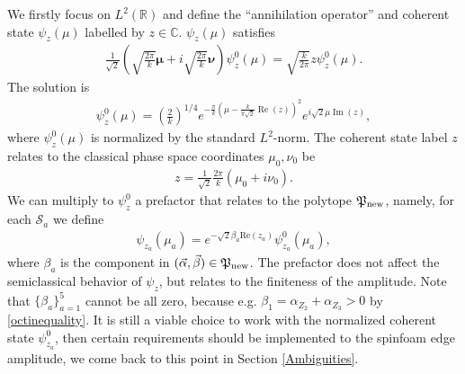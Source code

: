 \documentclass[aps,prd,notitlepage,nofootinbib,superscriptaddress,groupedaddress,twocolumn]{revtex4-1}
\def\C{\mathbb{C}}
\def\R{\mathbb{R}}
\def\be{\begin{eqnarray}}
\def\ee{\end{eqnarray}}
\newcommand{\cs}{\mathcal S}
\renewcommand{\a}{\alpha}
\renewcommand{\b}{\beta}
\newcommand{\rmd}{\mathrm d}
\newcommand{\lt}{\left}
\newcommand{\rt}{\right}
\begin{document}
We firstly focus on $L^2(\R)$ and define the ``annihilation operator'' and coherent state $\psi_z(\mu)$ labelled by $z\in\C$. $\psi_z(\mu)$ satisfies
\be
\frac{1}{\sqrt{2}}\lt(\sqrt{\frac{2\pi}{k}}\bm{\mu}+i\sqrt{\frac{2\pi}{k}}\bm{\nu}\rt)\psi^0_z(\mu)%
=\sqrt{\frac{k}{2\pi}}z\psi^0_z(\mu).\nonumber
\ee
The solution is
\be
\psi^0_z(\mu)%
=\lt(\frac{2}{k}\rt)^{1/4}e^{-\frac{\pi}{k}\left(\mu-\frac{k}{\pi \sqrt{2}} \operatorname{Re}\left(z\right)\right)^{2}} e^{i \sqrt{2}  \mu \operatorname{Im}\left(z\right)},\label{coheretntpsiz0}
\ee
where $\psi^0_z(\mu)$ is normalized by the standard $L^2$-norm. %
The coherent state label $z$ relates to the classical phase space coordinates $\mu_0,\nu_0$ be
\be
z=\frac{1}{\sqrt{2}}\frac{2\pi}{k}(\mu_0 +i\nu_0).\label{zmunu}
\ee
We can multiply to $\psi^0_z$ a prefactor that relates to the polytope $\mathfrak{P}_{\rm new}$, namely, for each $\cs_a$ we define
\be
\psi_{z_a}(\mu_a)=e^{-\sqrt{2}\b_a\mathrm{Re}(z_a)}\psi^0_{z_a}(\mu_a),\label{coheretntpsiz}
\ee
where $\b_a$ is the component in $(\vec{\a},\vec{\b})\in \Fp_{\rm new}$. The prefactor does not affect the semiclassical behavior of $\psi_z$, but relates to the finiteness of the amplitude. Note that $\{\b_a\}_{a=1}^5$ cannot be all zero, because e.g. $\b_1=\a_{Z_2}+\a_{Z_3}>0$ by \eqref{octinequality}. It is still a viable choice to work with the normalized coherent state $\psi^0_{z_a}$, then certain requirements should be implemented to the spinfoam edge amplitude, we come back to this point in Section \ref{Ambiguities}. 
\end{document}
